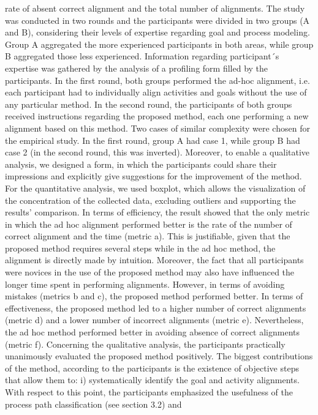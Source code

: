 rate of absent correct alignment and the total number of alignments.
The study was conducted in two rounds and the participants were divided in two
groups (A and B), considering their levels of expertise regarding goal and process modeling. Group A aggregated the more experienced participants in both areas, while group
B aggregated those less experienced. Information regarding participant´s expertise was
gathered by the analysis of a profiling form filled by the participants. In the first round,
both groups performed the ad-hoc alignment, i.e. each participant had to individually
align activities and goals without the use of any particular method. In the second round,
the participants of both groups received instructions regarding the proposed method,
each one performing a new alignment based on this method. Two cases of similar complexity were chosen for the empirical study. In the first round, group A had case 1,
while group B had case 2 (in the second round, this was inverted). Moreover, to enable 
a qualitative analysis, we designed a form, in which the participants could share their
impressions and explicitly give suggestions for the improvement of the method.
For the quantitative analysis, we used boxplot, which allows the visualization of the
concentration of the collected data, excluding outliers and supporting the results’ comparison. In terms of efficiency, the result showed that the only metric in which the ad
hoc alignment performed better is the rate of the number of correct alignment and the
time (metric a). This is justifiable, given that the proposed method requires several steps
while in the ad hoc method, the alignment is directly made by intuition. Moreover, the
fact that all participants were novices in the use of the proposed method may also have
influenced the longer time spent in performing alignments. However, in terms of avoiding mistakes (metrics b and c), the proposed method performed better. In terms of effectiveness, the proposed method led to a higher number of correct alignments (metric
d) and a lower number of incorrect alignments (metric e). Nevertheless, the ad hoc
method performed better in avoiding absence of correct alignments (metric f).
Concerning the qualitative analysis, the participants practically unanimously evaluated the proposed method positively. The biggest contributions of the method, according to the participants is the existence of objective steps that allow them to: i) systematically identify the goal and activity alignments. With respect to this point, the participants emphasized the usefulness of the process path classification (see section 3.2) and

